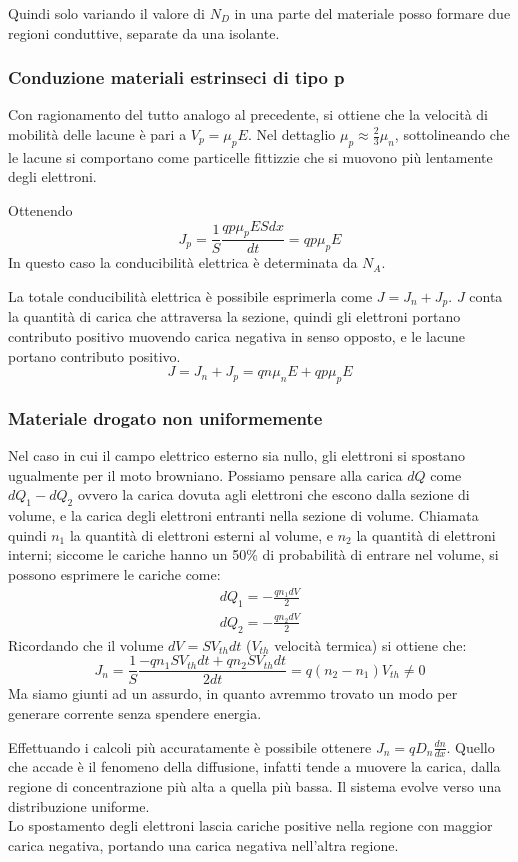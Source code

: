 \documentclass[../template]{subfiles}
\begin{document}
Quindi solo variando il valore di $N_D$ in una parte del materiale posso formare due regioni conduttive, separate da una isolante.

\subsubsection{Conduzione materiali estrinseci di tipo p}
Con ragionamento del tutto analogo al precedente, si ottiene che la velocità di mobilità delle lacune è pari a $V_p = \mu_p E$.
Nel dettaglio $\mu_p \approx \frac{2}{3} \mu_n$, sottolineando che le lacune si comportano come particelle fittizzie che si muovono più lentamente degli elettroni.

Ottenendo
\[
    J_p = \frac{1}{S}\frac{qp\mu_pESdx}{dt} = qp\mu_p E
\]
In questo caso la conducibilità elettrica è determinata da $N_A$.

La totale conducibilità elettrica è possibile esprimerla come $J = J_n + J_p$. $J$ conta la quantità di carica che attraversa la sezione, quindi gli elettroni portano contributo positivo muovendo carica negativa in senso opposto, e le lacune portano contributo positivo.
\[
    J = J_n + J_p = qn\mu_n E + qp \mu_p E
\]
\subsubsection{Materiale drogato non uniformemente}

Nel caso in cui il campo elettrico esterno sia nullo, gli elettroni si spostano ugualmente per il moto browniano.
Possiamo pensare alla carica $dQ$ come $dQ_1 - dQ_2$ ovvero la carica dovuta agli elettroni che escono dalla sezione di volume, e la carica degli elettroni entranti nella sezione di volume.
Chiamata quindi $n_1$ la quantità di elettroni esterni al volume, e $n_2$ la quantità di elettroni interni; siccome le cariche hanno un 50\% di probabilità di entrare nel volume, si possono esprimere le cariche come:
\begin{align*}
    dQ_1 = -\frac{q n_1 dV}{2}\\
    dQ_2 = -\frac{q n_2 dV}{2}
\end{align*}
Ricordando che il volume $dV = S V_{th} dt$ ($V_{th}$ velocità termica) si ottiene che:
\[
    J_n = \frac{1}{S} \frac{-qn_1 S V_{th} dt + qn_2 S V_{th} dt}{2dt}  = q(n_2 - n_1) V_{th} \neq 0
\]
Ma siamo giunti ad un assurdo, in quanto avremmo trovato un modo per generare corrente senza spendere energia.

Effettuando i calcoli più accuratamente è possibile ottenere $J_n = q D_n \frac{dn}{dx}$. Quello che accade è il fenomeno della diffusione, infatti tende a muovere la carica, dalla regione di concentrazione più alta a quella più bassa. Il sistema evolve verso una distribuzione uniforme.
\\
Lo spostamento degli elettroni lascia cariche positive nella regione con maggior carica negativa, portando una carica negativa nell'altra regione.
\end{document}
